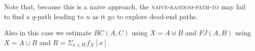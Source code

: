 Note that, because this is a naive approach, the \textsc{naive-random-path-to}
may fail to find a $q$-path leading to $u$ as it go to explore dead-end paths.

Also in this case we estimate $BC(A,C)$ using $X = A \uplus B$ and $FJ(A,B)$ using $X = A \cup B$ and $R = \Sigma_{x \in W} f_{X}[x]$.

\clearpage
